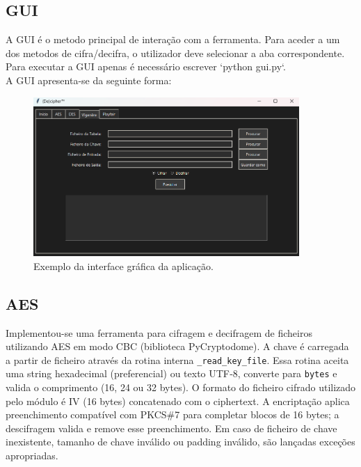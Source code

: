 \documentclass[a4paper]{article}
\begin{document}
\subsection{GUI}
A GUI é o metodo principal de interação com a ferramenta. Para aceder a um dos metodos de cifra/decifra, o utilizador deve selecionar a aba correspondente.
Para executar a GUI apenas é necessário escrever `python gui.py`.\\

A GUI apresenta-se da seguinte forma:\\
\begin{figure}[H]
	\centering
	\includegraphics[width=0.9\textwidth]{Recursos/GUI.png}
	\caption{Exemplo da interface gráfica da aplicação.}
	\label{fig:gui_main}
\end{figure}

\newpage
\subsection{AES}
Implementou-se uma ferramenta para cifragem e decifragem de ficheiros utilizando AES em modo CBC (biblioteca PyCryptodome).
A chave é carregada a partir de ficheiro através da rotina interna \texttt{\_read\_key\_file}. Essa rotina aceita uma string hexadecimal
(preferencial) ou texto UTF‑8, converte para \texttt{bytes} e valida o comprimento (16, 24 ou 32 bytes). O formato do ficheiro cifrado utilizado
pelo módulo é IV (16 bytes) concatenado com o ciphertext. A encriptação aplica preenchimento compatível com PKCS\#7 para completar blocos de 16 bytes;
a descifragem valida e remove esse preenchimento. Em caso de ficheiro de chave inexistente, tamanho de chave inválido ou padding inválido, são lançadas exceções apropriadas.\\\\
\end{document}
